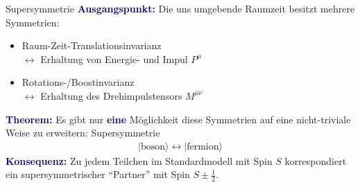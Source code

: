 \documentclass[hyperref={pdfpagelabels=false},ngerman]{beamer}
\renewcommand{\emph}[1]{\textbf{\textcolor{darkblue}{#1}}}
\begin{document}
\begin{frame}{Supersymmetrie}
  \emph{Ausgangspunkt:} Die uns umgebende Raumzeit besitzt mehrere
  Symmetrien:
  \begin{itemize}
  \item Raum-Zeit-Translationsinvarianz\\
    $\leftrightarrow$ Erhaltung von Energie- und Impul $P^\mu$
  \item Rotations-/Boostinvarianz\\
    $\leftrightarrow$ Erhaltung des Drehimpulstensors $M^{\mu\nu}$
  \end{itemize}
  \vspace*{1em}
  \emph{Theorem:} Es gibt nur \emph{eine} Möglichkeit diese Symmetrien
  auf eine nicht-triviale Weise zu erweitern: Supersymmetrie
  \begin{align*}
    |\text{boson}\rangle \leftrightarrow |\text{fermion}\rangle
  \end{align*}
  \emph{Konsequenz:} Zu jedem Teilchen im Standardmodell mit Spin $S$
  korrespondiert ein supersymmetrischer ``Partner'' mit Spin
  $S \pm \frac{1}{2}$.
\end{frame}
\end{document}

